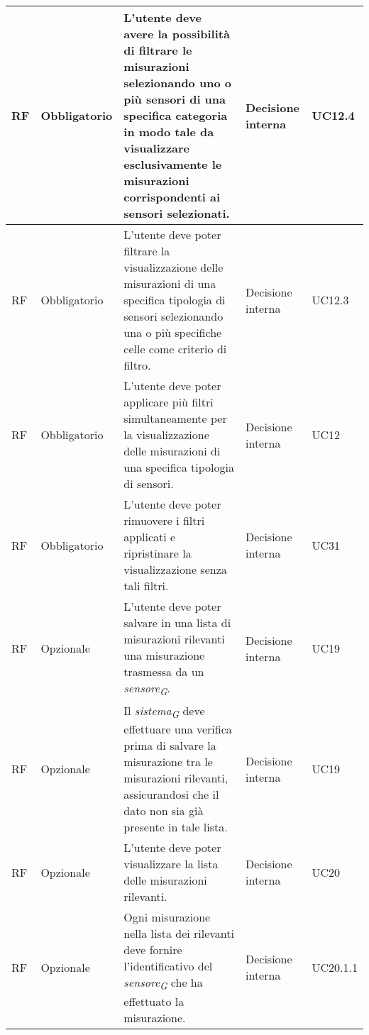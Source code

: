 \begin{longtable}{|C{1.5cm}|C{2cm}|L{5cm}|C{2cm}|C{1.5cm}|}
    \hline
     RF & Obbligatorio & L'utente deve avere la possibilità di filtrare le misurazioni selezionando uno o più sensori di una specifica categoria in modo tale da visualizzare esclusivamente le misurazioni corrispondenti ai sensori selezionati.& Decisione interna & UC12.4 \\
    
    \hline
     RF & Obbligatorio & L'utente deve poter filtrare la visualizzazione delle misurazioni di una specifica tipologia di sensori selezionando una o più specifiche celle come criterio di filtro.& Decisione interna & UC12.3 \\
    
    \hline
     RF & Obbligatorio & L'utente deve poter applicare più filtri simultaneamente per la visualizzazione delle misurazioni di una specifica tipologia di sensori.& Decisione interna & UC12 \\
    
    \hline
     RF & Obbligatorio & L'utente deve poter rimuovere i filtri applicati e ripristinare la visualizzazione senza tali filtri.& Decisione interna & UC31 \\
    
    \hline
     RF & Opzionale & L'utente deve poter salvare in una lista di misurazioni rilevanti una misurazione trasmessa da un \textit{sensore}\textsubscript{\textit{G}}.& Decisione interna & UC19 \\
    
    \hline
     RF & Opzionale & Il \textit{sistema}\textsubscript{\textit{G}} deve effettuare una verifica prima di salvare la misurazione tra le misurazioni rilevanti, assicurandosi che il dato non sia già presente in tale lista.& Decisione interna & UC19  \\
    
    \hline
     RF & Opzionale & L'utente deve poter visualizzare la lista delle misurazioni rilevanti.& Decisione interna & UC20 \\
    
    \hline
     RF & Opzionale & Ogni misurazione nella lista dei rilevanti deve fornire l'identificativo del \textit{sensore}\textsubscript{\textit{G}} che ha effettuato la misurazione.& Decisione interna & UC20.1.1 \\


\end{longtable}
